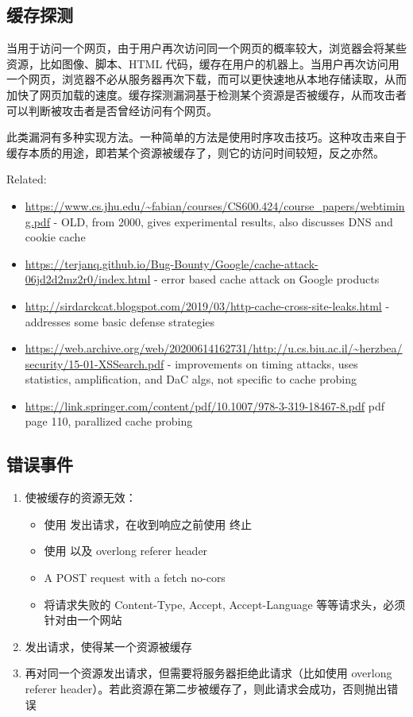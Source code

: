 \subsection{缓存探测}

当用于访问一个网页，由于用户再次访问同一个网页的概率较大，浏览器会将某些资源，比如图像、脚本、HTML 代码，缓存在用户的机器上。当用户再次访问用一个网页，浏览器不必从服务器再次下载，而可以更快速地从本地存储读取，从而加快了网页加载的速度。缓存探测漏洞基于检测某个资源是否被缓存，从而攻击者可以判断被攻击者是否曾经访问有个网页。

此类漏洞有多种实现方法。一种简单的方法是使用时序攻击技巧。这种攻击来自于缓存本质的用途，即若某个资源被缓存了，则它的访问时间较短，反之亦然。


Related:

\begin{itemize}
    \item \url{https://www.cs.jhu.edu/~fabian/courses/CS600.424/course_papers/webtiming.pdf} - OLD, from 2000, gives experimental results, also discusses DNS and cookie cache
    \item \url{https://terjanq.github.io/Bug-Bounty/Google/cache-attack-06jd2d2mz2r0/index.html} - error based cache attack on Google products
    \item \url{http://sirdarckcat.blogspot.com/2019/03/http-cache-cross-site-leaks.html} - addresses some basic defense strategies
    \item \url{https://web.archive.org/web/20200614162731/http://u.cs.biu.ac.il/~herzbea/security/15-01-XSSearch.pdf} - improvements on timing attacks, uses statistics, amplification, and DaC algs, not specific to cache probing
    \item \url{https://link.springer.com/content/pdf/10.1007/978-3-319-18467-8.pdf} pdf page 110, parallized cache probing
\end{itemize}

\subsection{错误事件}

\begin{enumerate}
    \item 使被缓存的资源无效：
    \begin{itemize}
        \item 使用  发出请求，在收到响应之前使用  终止
        \item 使用  以及 overlong referer header
        \item A POST request with a fetch no-cors
        \item 将请求失败的 Content-Type, Accept, Accept-Language 等等请求头，必须针对由一个网站
    \end{itemize}
    \item 发出请求，使得某一个资源被缓存
    \item 再对同一个资源发出请求，但需要将服务器拒绝此请求（比如使用 overlong referer header）。若此资源在第二步被缓存了，则此请求会成功，否则抛出错误
\end{enumerate}

